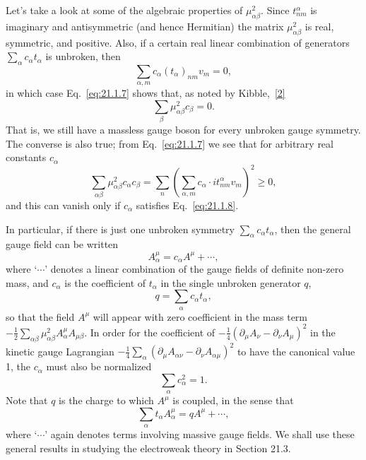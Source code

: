 Let's take a look at some of the algebraic properties of
$\mu^2_{\alpha\beta}$. Since $t^\alpha_{nm}$ is imaginary and antisymmetric
(and hence Hermitian) the matrix $\mu^2_{\alpha\beta}$ is real, symmetric,
and positive. Also, if a certain real linear combination of generators
$\sum_\alpha c_\alpha t_\alpha$ is unbroken, then
\begin{equation}
 \sum_{\alpha,m}c_\alpha(t_\alpha)_{nm}v_m=0,
 \tag{21.1.8}\label{eq:21.1.8}
\end{equation}
in which case Eq.~\eqref{eq:21.1.7} shows that, as noted by
Kibble,~\hyperref[ch21-ref-2]{[2]}
\begin{equation}
 \sum_\beta\mu^2_{\alpha\beta}c_\beta=0.
 \tag{21.1.9}\label{eq:21.1.9}
\end{equation}
That is, we still have a massless gauge boson for every unbroken gauge
symmetry. The converse is also true; from Eq.~\eqref{eq:21.1.7} we see that
for arbitrary real constants $c_\alpha$
\begin{equation}
 \sum_{\alpha\beta}\mu^2_{\alpha\beta}c_\alpha c_\beta
 =\sum_n\left(\sum_{\alpha,m}
 c_\alpha\cdot it^\alpha_{nm}v_m\right)^2\geq 0,
 \tag{21.1.10}\label{eq:21.1.10}
\end{equation}
and this can vanish only if $c_\alpha$ satisfies Eq.~\eqref{eq:21.1.8}.

In particular, if there is just one unbroken symmetry
$\sum_\alpha c_\alpha t_\alpha$, then the general gauge field can be written
\begin{equation}
 A_\alpha^\mu=c_\alpha A^\mu+\cdots,
 \tag{21.1.11}\label{eq:21.1.11}
\end{equation}
where `$\cdots$' denotes a linear combination of the gauge fields of
definite non-zero mass, and $c_\alpha$ is the coefficient of $t_\alpha$ in
the single unbroken generator $q$,
\begin{equation}
 q=\sum_\alpha c_\alpha t_\alpha,
 \tag{21.1.12}\label{eq:21.1.12}
\end{equation}
so that the field $A^\mu$ will appear with zero coefficient in the mass
term $-\frac12\sum_{\alpha\beta}\mu^2_{\alpha\beta}
A_\alpha^\mu A_{\mu\beta}$. In order for the coefficient of
$-\frac14(\partial_\mu A_\nu\allowbreak-\partial_\nu A_\mu)^2$ in the kinetic gauge
Lagrangian
$-\frac14\sum_\alpha(\partial_\mu A_{\alpha\nu}
\allowbreak-\partial_\nu A_{\alpha\mu})^2$ to have the canonical value 1, the
$c_\alpha$ must also be normalized
\begin{equation}
 \sum_\alpha c_\alpha^2=1.
 \tag{21.1.13}\label{eq:21.1.13}
\end{equation}
Note that $q$ is the charge to which $A^\mu$ is coupled, in the sense that
\begin{equation}
 \sum_\alpha t_\alpha A_\alpha^\mu=qA^\mu+\cdots,
 \tag{21.1.14}\label{eq:21.1.14}
\end{equation}
where `$\cdots$' again denotes terms involving massive gauge fields. We
shall use these general results in studying the electroweak theory in
Section 21.3.

